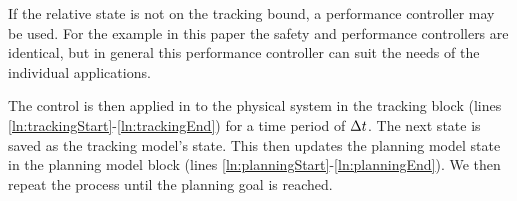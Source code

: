 If the relative state is not on the tracking bound, a performance controller may be used. For the example in this paper the safety and performance controllers are identical, but in general this performance controller can suit the needs of the individual applications.

The control is then applied in to the physical system in the tracking block (lines \ref{ln:trackingStart}-\ref{ln:trackingEnd}) for a time period of $\Delta t$. The next state is saved as the tracking model's state. This then updates the planning model state in the planning model block (lines \ref{ln:planningStart}-\ref{ln:planningEnd}). We then repeat the process until the planning goal is reached.